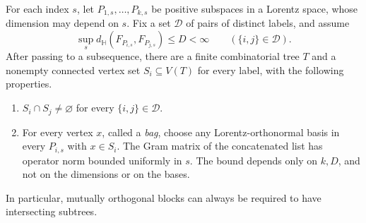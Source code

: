 \begin{proposition}\label{mt:finite-tree}
For each index \(s\), let \(P_{1,s},\ldots,P_{k,s}\) be positive
subspaces in a Lorentz space, whose dimension may depend on \(s\).
Fix a set \(\mathcal D\) of pairs of distinct labels, and assume
\[
 \sup_s d_{\mathbb H}(F_{P_{i,s}},F_{P_{j,s}})\le D<\infty
 \qquad (\{i,j\}\in\mathcal D).
\]
After passing to a subsequence, there are a finite combinatorial tree
\(T\) and a nonempty connected vertex set \(S_i\subseteq V(T)\)
for every label, with the following properties.
\begin{enumerate}[label=\textup{(\roman*)}]
\item \(S_i\cap S_j\ne\varnothing\) for every
\(\{i,j\}\in\mathcal D\).
\item For every vertex \(x\), called a \emph{bag}, choose any
Lorentz-orthonormal basis in every \(P_{i,s}\) with \(x\in S_i\).
The Gram matrix of the concatenated list has operator norm bounded
uniformly in \(s\).  The bound depends only on \(k,D\), and not on
the dimensions or on the bases.
\end{enumerate}
In particular, mutually orthogonal blocks can always be required to
have intersecting subtrees.
\end{proposition}
